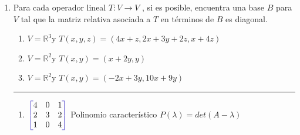 \documentclass[a4paper,10pt]{article}
\newenvironment{bmatrixcolor}[1][red]
  {\colorlet{savethecolor}{.}\colorlet{bracecolor}{#1}%
    \color{bracecolor}\left[\color{savethecolor}\begin{matrix}}
  {\end{matrix}\color{bracecolor}\right]}
\begin{document}
\begin{enumerate}
    \item Para cada operador lineal $T : V \rightarrow V$ , si es posible, encuentra una base $B$ para $V$ tal que la matriz relativa
    asociada a $T$ en términos de $B$ es diagonal.

        \begin{enumerate}
            \item $V=\mathds{R}^{3}$y $T(x,y,z)=(4x+z,2x+3y+2z,x+4z)$
            \item $V=\mathds{R}^{2}$y $T(x,y)=(x+2y,y)$
            \item $V=\mathds{R}^{2}$y $T(x,y)=(-2x+3y,10x+9y)$
        \end{enumerate}

        {\color{cadmiumyellow} \rule{\linewidth}{0.5mm} } 
        \begin{enumerate}
          
          \item  $\begin{bmatrixcolor}[iris]
            4 & 0 & 1    \\
            2 & 3 & 2   \\
            1 & 0 & 4          
        \end{bmatrixcolor}$ \hspace{.5cm}{matriz asociada }\hspace{2cm} {Polinomio característico $P(\lambda)=det(A-\lambda)$ }


\end{enumerate}
\end{enumerate}
\end{document}
